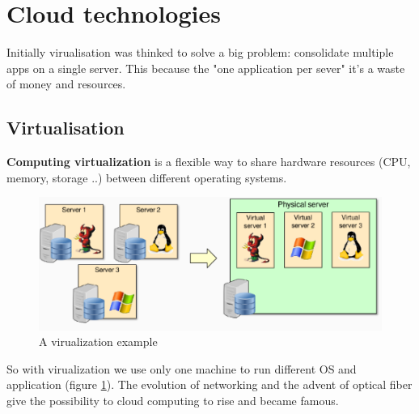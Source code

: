 \section{Cloud technologies}
Initially virualisation was thinked to solve a big problem: consolidate multiple apps on a single server. This because the "one application per sever" it's a waste of money and resources.
\subsection{Virtualisation}
\textbf{Computing virtualization} is a flexible way to share hardware resources (CPU, memory, storage ..) between different operating systems.
\begin{figure}
    \centering
    \includegraphics[scale=0.5]{images/virualisation.png}
    \caption{A virualization example}
    \label{fig:virt}
\end{figure}
So with virualization we use only one machine to run different OS and application (figure \ref{fig:virt}). The evolution of networking and the advent of optical fiber give the possibility to cloud computing to rise and became famous. 

